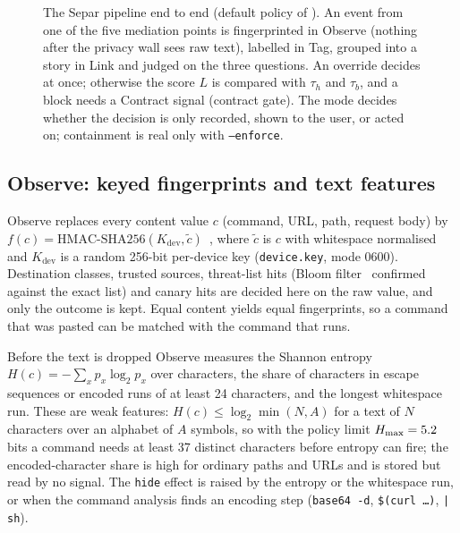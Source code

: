 \documentclass[10pt,twocolumn,letterpaper]{article}
\begin{document}
\begin{figure}[!t]
  \centering
  \caption{The Separ pipeline end to end (default policy of \texttt{\EvalTag}). An event from one of
  the five mediation points is fingerprinted in Observe (nothing after the privacy wall sees raw
  text), labelled in Tag, grouped into a story in Link and judged on the three questions. An
  override decides at once; otherwise the score $L$ is compared with $\tau_h$ and $\tau_b$, and a
  block needs a Contract signal (contract gate). The mode decides whether the decision is only
  recorded, shown to the user, or acted on; containment is real only with \texttt{--enforce}.}
  \label{fig:flow}
\end{figure}

\subsection{Observe: keyed fingerprints and text features}
\label{sec:privacy}
Observe replaces every content value $c$ (command, URL, path, request body) by
$f(c) = \text{HMAC-SHA256}(K_{\text{dev}}, \tilde c)$~\cite{bellare1996keying}, where $\tilde c$
is $c$ with whitespace normalised and $K_{\text{dev}}$ is a random 256-bit per-device key
(\texttt{device.key}, mode 0600). Destination classes, trusted sources, threat-list hits (Bloom
filter~\cite{bloom1970space} confirmed against the exact list) and canary hits are decided here on
the raw value, and only the outcome is kept. Equal content yields equal fingerprints, so a command
that was pasted can be matched with the command that runs.

Before the text is dropped Observe measures the Shannon entropy $H(c) = -\sum_x p_x\log_2 p_x$
over characters, the share of characters in escape sequences or encoded runs of at least 24
characters, and the longest whitespace run. These are weak features: $H(c) \le \log_2 \min(N, A)$
for a text of $N$ characters over an alphabet of $A$ symbols, so with the policy limit
$H_{\max} = 5.2$ bits a command needs at least 37 distinct characters before entropy can fire;
the encoded-character share is high for ordinary paths and URLs and is stored but read by no signal.
The \texttt{hide} effect is raised by the entropy or the whitespace run, or when the command
analysis finds an encoding step (\texttt{base64 -d}, \texttt{\$(curl \ldots)}, \texttt{| sh}).
\end{document}
